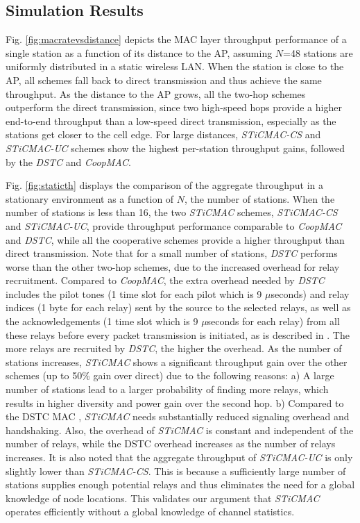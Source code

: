 \documentclass[peerreview,draftcls,onecolumn,12pt,a4paper]{IEEEtran}
\begin{document}
\vspace{-0.15in}
\subsection{Simulation Results} \label{simulationresult}
\vspace{-0.05in}

Fig. \ref{fig:macratevsdistance} depicts the MAC layer throughput
performance of a single station as a function of its distance to
the AP, assuming $N$=48 stations are uniformly distributed in a
static wireless LAN. When the station is close to the AP, all
schemes fall back to direct transmission  and thus achieve the
same throughput. As the distance to the AP grows, all
the two-hop schemes outperform the direct transmission, since two
high-speed hops provide a higher end-to-end throughput than a
low-speed direct transmission, especially as the stations get
closer to the cell edge. For large distances, \emph{STiCMAC-CS}
and \emph{STiCMAC-UC} schemes show the highest per-station
throughput gains, followed by the \emph{DSTC} and \emph{CoopMAC}.

Fig. \ref{fig:staticth} displays the comparison of the aggregate
throughput in a stationary environment as a function of $N$, the
number of stations. When the number of stations is less than 16,
the two \emph{STiCMAC} schemes, \emph{STiCMAC-CS} and
\emph{STiCMAC-UC}, provide throughput performance comparable to
\emph{CoopMAC} and {\em DSTC}, while all the cooperative schemes
provide a higher throughput than direct transmission. Note that
for a small number of stations, {\em DSTC} performs worse than the
other two-hop schemes, due to the increased overhead for relay
recruitment. Compared to {\em CoopMAC}, the extra overhead needed
by {\em DSTC} includes the pilot tones (1 time slot for each pilot
which is 9 $\mu$seconds) and relay indices (1 byte for each relay)
sent by the source to the selected relays, as well as the
acknowledgements (1 time slot which is 9 $\mu$seconds for each
relay) from all these relays before every packet transmission is
initiated, as is described in \cite{Jakllari06}. The more relays
are recruited by {\em DSTC}, the higher the overhead. As the
number of stations increases, \emph{STiCMAC} shows a significant
throughput gain over the other schemes (up to 50\% gain over direct) due to the following
reasons: a) A large number of stations lead to a larger
probability of finding more relays, which results in higher
diversity and power gain over the second hop. b) Compared to the
DSTC MAC \cite{Jakllari06}, \emph{STiCMAC} needs substantially
reduced signaling overhead and handshaking. Also, the
overhead of {\em STiCMAC} is constant and independent of the
number of relays, while the DSTC overhead increases as the number
of relays increases. It is also noted that the aggregate throughput of \emph{STiCMAC-UC} is only slightly lower than \emph{STiCMAC-CS}. This is because a sufficiently large number of stations supplies enough potential relays and thus eliminates the need for a
global knowledge of node locations. This validates our argument that {\em STiCMAC} operates
efficiently without a global knowledge of channel statistics.
\end{document}
